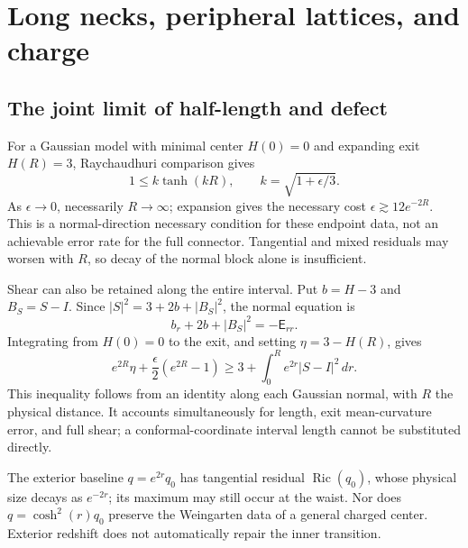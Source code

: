 \documentclass[a4paper,11pt]{article}
\numberwithin{equation}{section}
\theoremstyle{definition}
\newcommand{\Ric}{\operatorname{Ric}}
\begin{document}
\section{Long necks, peripheral lattices, and charge}
\subsection{The joint limit of half-length and defect}
For a Gaussian model with minimal center $H(0)=0$ and expanding exit $H(R)=3$, Raychaudhuri comparison gives
\[
1\le k\tanh(kR),\qquad k=\sqrt{1+\epsilon/3}.
\]
As $\epsilon\to0$, necessarily $R\to\infty$; expansion gives the necessary cost $\epsilon\gtrsim12e^{-2R}$. This is a normal-direction necessary condition for these endpoint data, not an achievable error rate for the full connector. Tangential and mixed residuals may worsen with $R$, so decay of the normal block alone is insufficient.

Shear can also be retained along the entire interval. Put $b=H-3$ and $B_S=S-I$.
Since $|S|^2=3+2b+|B_S|^2$, the normal equation is
\[
 b_r+2b+|B_S|^2=-\mathsf E_{rr}.
\]
Integrating from $H(0)=0$ to the exit, and setting $\eta=3-H(R)$, gives
\begin{equation}\label{eq:normal-shear-budget}
 e^{2R}\eta+\frac{\epsilon}{2}(e^{2R}-1)
 \ge3+\int_0^Re^{2r}|S-I|^2\,dr.
\end{equation}
This inequality follows from an identity along each Gaussian normal, with $R$ the physical distance.
It accounts simultaneously for length, exit mean-curvature error, and full shear; a conformal-coordinate interval length cannot be substituted directly.

The exterior baseline $q=e^{2r}q_0$ has tangential residual $\Ric(q_0)$, whose physical size decays as $e^{-2r}$; its maximum may still occur at the waist. Nor does $q=\cosh^2(r)q_0$ preserve the Weingarten data of a general charged center. Exterior redshift does not automatically repair the inner transition.
\end{document}
